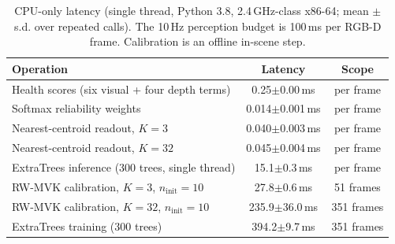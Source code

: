\documentclass[11pt, a4paper]{article}
\begin{document}
\begin{table}[htbp]
    \centering
    \caption{CPU-only latency (single thread, Python 3.8, 2.4\,GHz-class x86-64; mean $\pm$ s.d. over repeated calls). The 10\,Hz perception budget is 100\,ms per RGB-D frame. Calibration is an offline in-scene step.}
    \label{tab:runtime}
    \footnotesize
    \setlength{\tabcolsep}{4.0pt}
    \begin{tabularx}{\textwidth}{>{\raggedright\arraybackslash}X cc}
        \toprule
        \textbf{Operation} & \textbf{Latency} & \textbf{Scope} \\
        \midrule
        Health scores (six visual + four depth terms) & 0.25$\pm$0.00\,ms & per frame \\
        Softmax reliability weights & 0.014$\pm$0.001\,ms & per frame \\
        Nearest-centroid readout, $K=3$ & 0.040$\pm$0.003\,ms & per frame \\
        Nearest-centroid readout, $K=32$ & 0.045$\pm$0.004\,ms & per frame \\
        ExtraTrees inference (300 trees, single thread) & 15.1$\pm$0.3\,ms & per frame \\
        RW-MVK calibration, $K=3$, $n_{\text{init}}=10$ & 27.8$\pm$0.6\,ms & 51 frames \\
        RW-MVK calibration, $K=32$, $n_{\text{init}}=10$ & 235.9$\pm$36.0\,ms & 351 frames \\
        ExtraTrees training (300 trees) & 394.2$\pm$9.7\,ms & 351 frames \\
        \bottomrule
    \end{tabularx}
\end{table}
\end{document}
